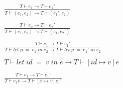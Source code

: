 \begin{figure}[htb]
\begin{align*}
\tag{E-PairLeft}
&\frac{T \vdash e_{1} \rightarrow T \vdash e_{1}'}
{T \vdash (e_{1},e_{2}) \rightarrow T \vdash (e_{1}',e_{2})}
\\
\\
\tag{E-PairRight}
&\frac{T \vdash e_{2} \rightarrow T \vdash e_{2}'}
{T \vdash (e_{1},e_{2}) \rightarrow T \vdash (e_{1},e_{2}')}
\\
\\
\tag{E-Let}
&\frac{T \vdash e_{1}\rightarrow T \vdash e_{1}'}
{T \vdash let \; p \; = \; e_{1} \; in \; e_{2} \rightarrow T \vdash let \; p \; = \; e_{1}' \; in \; e_{2}}
\\ \\
\tag{E-LetV}
&T \vdash let \; id \; = \; v \; in \; e \rightarrow T \vdash [id \mapsto v]e \\ \\
\tag{E-App1}
&\frac{T \vdash e_{1} \rightarrow T \vdash e_{1}'}
{T \vdash e_{1} \overline{v} \rightarrow T \vdash [\overline{x} \mapsto \overline{v}]e_{1}'}

\end{align*}
\end{figure}
